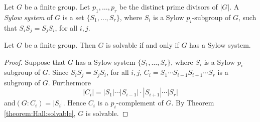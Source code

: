 \begin{definition}
 Let $G$ be a finite group. Let $p_1,\dots ,p_r$ be the distinct prime divisors of $|G|$. A {\em Sylow system} of $G$ is a set $\{ S_1,\dots ,S_r\}$, where $S_i$ is a Sylow $p_i$-subgroup of $G$, such that $S_iS_j=S_jS_i$, for all $i,j$. 
\end{definition}

\begin{theorem}[Hall]
Let $G$ be a finite group. Then $G$ is solvable if and only if $G$ has a Sylow system.
\end{theorem}

\begin{proof}
    Suppose that $G$ has a Sylow system $\{ S_1,\dots, S_r\}$, where $S_i$ is a Sylow $p_i$-subgroup of $G$. Since $S_iS_j=S_jS_i$, for all $i,j$, $C_i=S_1\cdots S_{i-1}S_{i+1}\cdots S_r$ is a subgroup of $G$. Furthermore 
    \[ |C_i|=|S_1|\cdots |S_{i-1}|\cdot |S_{i+1}|\cdots |S_r|\]
    and$(G:C_i)=|S_i|$. Hence $C_i$ is a $p_i$-complement of $G$. By Theorem \ref{theorem:Hall:solvable}, $G$ is solvable.
    

\end{proof}
